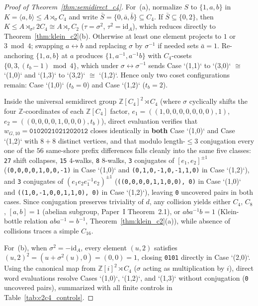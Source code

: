 \documentclass[11pt]{amsart}
\theoremstyle{definition}
\theoremstyle{remark}
\newcommand{\Z}{\mathbb{Z}}
\newcommand{\id}{\mathrm{id}}
\begin{document}
\begin{proof}[Proof of Theorem~\ref{thm:semidirect_c4}]
For~(a), normalize $S$ to $\{1, a, b\}$ in $K = \langle a, b \rangle \le A \rtimes_\sigma C_4$ and write $\bar{S} = \{0, \bar{a}, \bar{b}\} \subseteq C_4$. If $\bar{S} \subseteq \{0, 2\}$, then $K \le A \rtimes_{\sigma^2} 2C_4 \cong A \rtimes_\tau C_2$ ($\tau = \sigma^2$, $\tau^2 = \id_A$), which reduces directly to Theorem~\ref{thm:klein_c2}(b). Otherwise at least one element projects to $1$ or $3 \bmod 4$; swapping $a \leftrightarrow b$ and replacing $\sigma$ by $\sigma^{-1}$ if needed sets $\bar{a} = 1$. Re-anchoring $\{1, a, b\}$ at $a$ produces $\{1, a^{-1}, a^{-1}b\}$ with $C_4$-cosets $\{0, 3, (t_b - 1) \bmod 4\}$, which under $\sigma \leftrightarrow \sigma^{-1}$ sends Case `(1,1)` to `(3,0)` $\cong$ `(1,0)` and `(1,3)` to `(3,2)` $\cong$ `(1,2)`. Hence only two coset configurations remain: Case `(1,0)` ($t_b = 0$) and Case `(1,2)` ($t_b = 2$).

Inside the universal semidirect group $\Z[C_4]^2 \rtimes C_4$ (where $\sigma$ cyclically shifts the four $\Z$-coordinates of each $\Z[C_4]$ factor, $e_1 = ((1,0,0,0,0,0,0,0), 1)$, $e_2 = ((0,0,0,0,1,0,0,0), t_b)$), direct evaluation verifies that $w_{G,10} = \mathtt{0102021021202012}$ closes identically in \textbf{both} Case `(1,0)` and Case `(1,2)` with $8 + 8$ distinct vertices, and that modulo length-$\le 3$ conjugation every one of the $56$ same-shore prefix differences falls cleanly into the same five classes: \texttt{27} shift collapses, \texttt{15} $4$-walks, \texttt{8} $8$-walks, \texttt{3} conjugates of $[e_1, e_2]^{\pm 1}$ (\texttt{(0,0,0,0,1,0,0,-1)} in Case `(1,0)` and \texttt{(0,1,0,-1,0,-1,1,0)} in Case `(1,2)`), and \texttt{3} conjugates of $(e_1 e_2 e_1^{-1} e_2)^{\pm 1}$ (\texttt{((0,0,0,0,1,1,0,0), 0)} in Case `(1,0)` and \texttt{((1,0,-1,0,0,1,1,0), 0)} in Case `(1,2)`), leaving \texttt{0} uncovered pairs in both cases. Since conjugation preserves triviality of $d$, any collision yields either $C_4$, $C_8$, $[a,b] = 1$ (abelian subgroup, Paper~I Theorem~2.1), or $a b a^{-1} b = 1$ (Klein-bottle relation $a b a^{-1} = b^{-1}$, Theorem~\ref{thm:klein_c2}(a)), while absence of collisions traces a simple $C_{16}$.

For~(b), when $\sigma^2 = -\id_A$, every element $(u, 2)$ satisfies $(u, 2)^2 = (u + \sigma^2(u), 0) = (0,0) = 1$, closing \texttt{0101} directly in Case `(2,0)`. Using the canonical map from $\Z[i]^2 \rtimes C_4$ ($\sigma$ acting as multiplication by $i$), direct word evaluations resolve Cases `(1,0)`, `(1,2)`, and `(1,3)` without conjugation (\texttt{0} uncovered pairs), summarized with all finite controls in Table~\ref{tab:c2c4_controls}.


\end{proof}
\end{document}

